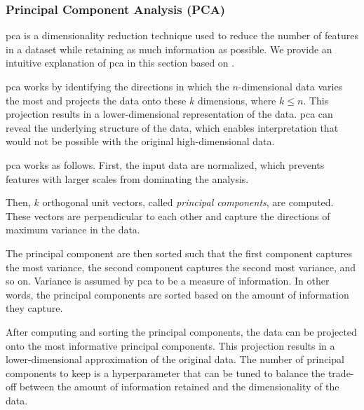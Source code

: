 \subsubsection{Principal Component Analysis (PCA)}\label{subsec:pca}
\gls{pca} is a dimensionality reduction technique used to reduce the number of features in a dataset while retaining as much information as possible.
We provide an intuitive explanation of \gls{pca} in this section based on \citet{dataminingConcepts}.

\gls{pca} works by identifying the directions in which the $n$-dimensional data varies the most and projects the data onto these $k$ dimensions, where $k \leq n$.
This projection results in a lower-dimensional representation of the data.
\gls{pca} can reveal the underlying structure of the data, which enables interpretation that would not be possible with the original high-dimensional data.

\gls{pca} works as follows.
First, the input data are normalized, which prevents features with larger scales from dominating the analysis.

Then, $k$ orthogonal unit vectors, called \textit{principal components}, are computed.
These vectors are perpendicular to each other and capture the directions of maximum variance in the data.

The principal component are then sorted such that the first component captures the most variance, the second component captures the second most variance, and so on.
Variance is assumed by \gls{pca} to be a measure of information.
In other words, the principal components are sorted based on the amount of information they capture.

After computing and sorting the principal components, the data can be projected onto the most informative principal components.
This projection results in a lower-dimensional approximation of the original data.
The number of principal components to keep is a hyperparameter that can be tuned to balance the trade-off between the amount of information retained and the dimensionality of the data.